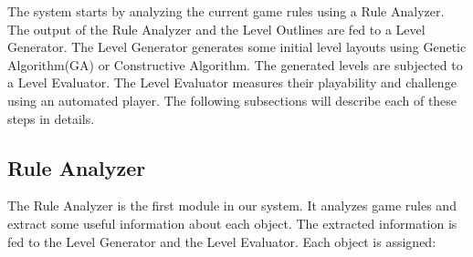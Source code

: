 \documentclass[letterpaper]{article}
\begin{document}
The system starts by analyzing the current game rules using a Rule Analyzer. The output of the Rule Analyzer and the Level Outlines are fed to a Level Generator. The Level Generator generates some initial level layouts using Genetic Algorithm(GA) or Constructive Algorithm. The generated levels are subjected to a Level Evaluator. The Level Evaluator measures their playability and challenge using an automated player. The following subsections will describe each of these steps in details.

\subsection{Rule Analyzer}
The Rule Analyzer is the first module in our system. It analyzes game rules and extract some useful information about each object. The extracted information is fed to the Level Generator and the Level Evaluator. Each object is assigned:
\end{document}

